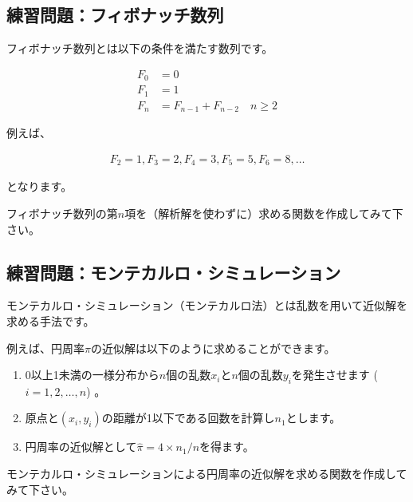 \documentclass[]{bxjsarticle}
\providecommand{\tightlist}{%
  \setlength{\itemsep}{0pt}\setlength{\parskip}{0pt}}
\begin{document}
\hypertarget{ux7df4ux7fd2ux554fux984cux30d5ux30a3ux30dcux30caux30c3ux30c1ux6570ux5217}{%
\subsection{練習問題：フィボナッチ数列}\label{ux7df4ux7fd2ux554fux984cux30d5ux30a3ux30dcux30caux30c3ux30c1ux6570ux5217}}

フィボナッチ数列とは以下の条件を満たす数列です。

\[
\begin{aligned}
  F_0 &= 0 \\
  F_1 &= 1 \\
  F_{n} &= F_{n-1} + F_{n-2} \quad n \geq 2
\end{aligned}
\]

例えば、

\[
\begin{aligned}
  F_2 = 1, F_3 = 2, F_4 = 3, F_5 = 5, F_6 = 8,\ldots
\end{aligned}
\]

となります。

フィボナッチ数列の第\(n\)項を（解析解を使わずに）求める関数を作成してみて下さい。

\hypertarget{ux7df4ux7fd2ux554fux984cux30e2ux30f3ux30c6ux30abux30ebux30edux30b7ux30dfux30e5ux30ecux30fcux30b7ux30e7ux30f3}{%
\subsection{練習問題：モンテカルロ・シミュレーション}\label{ux7df4ux7fd2ux554fux984cux30e2ux30f3ux30c6ux30abux30ebux30edux30b7ux30dfux30e5ux30ecux30fcux30b7ux30e7ux30f3}}

モンテカルロ・シミュレーション（モンテカルロ法）とは乱数を用いて近似解を求める手法です。

例えば、円周率\(\pi\)の近似解は以下のように求めることができます。

\begin{enumerate}
\def\labelenumi{\arabic{enumi}.}
\tightlist
\item
  0以上1未満の一様分布から\(n\)個の乱数\(x_i\)と\(n\)個の乱数\(y_i\)を発生させます (\(i = 1,2,\ldots,n\)) 。
\item
  原点と\((x_i,y_i)\)の距離が1以下である回数を計算し\(n_1\)とします。
\item
  円周率の近似解として\(\hat{\pi} = 4 \times n_1/n\)を得ます。
\end{enumerate}

モンテカルロ・シミュレーションによる円周率の近似解を求める関数を作成してみて下さい。
\end{document}
